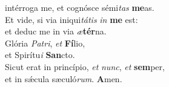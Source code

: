 \evenverse intérroga me, et cognósce sémi\textit{tas} \textbf{me}as.\\
\oddverse Et vide, si via iniqui\textit{tá}\textit{tis} \textit{in} \textbf{me} est:~\*\\
\oddverse et deduc me in via \textit{æ}\textbf{tér}na.\\
\evenverse Glória \textit{Pa}\textit{tri}, \textit{et} \textbf{Fí}lio,~\*\\
\evenverse et Spirítu\textit{i} \textbf{San}cto.\\
\oddverse Sicut erat in princípio, \textit{et} \textit{nunc}, \textit{et} \textbf{sem}per,~\*\\
\oddverse et in sǽcula sæculó\textit{rum}. \textbf{A}men.\\
